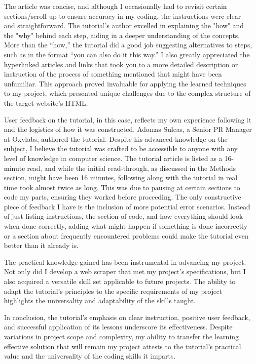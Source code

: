 \documentclass[10pt,twocolumn]{article}
\begin{document}
The article was concise, and although I occasionally had to revisit certain sections/scroll up to ensure accuracy in my coding, the instructions were clear and straightforward. The tutorial's author excelled in explaining the "how" and the "why" behind each step, aiding in a deeper understanding of the concepts. More than the “how,” the tutorial did a good job suggesting alternatives to steps, such as in the format “you can also do it this way.”  I also greatly appreciated the hyperlinked articles and links that took you to a more detailed description or instruction of the process of something mentioned that might have been unfamiliar. This approach proved invaluable for applying the learned techniques to my project, which presented unique challenges due to the complex structure of the target website's HTML.

User feedback on the tutorial, in this case, reflects my own experience following it and the logistics of how it was constructed. Adomas Sulcas, a Senior PR Manager at Oxylabs, authored the tutorial. Despite his advanced knowledge on the subject, I believe the tutorial was crafted to be accessible to anyone with any level of knowledge in computer science. The tutorial article is listed as a 16-minute read, and while the initial read-through, as discussed in the Methods section, might have been 16 minutes, following along with the tutorial in real time took almost twice as long. This was due to pausing at certain sections to code my parts, ensuring they worked before proceeding. The only constructive piece of feedback I have is the inclusion of more potential error scenarios. Instead of just listing instructions, the section of code, and how everything should look when done correctly, adding what might happen if something is done incorrectly or a section about frequently encountered problems could make the tutorial even better than it already is.

The practical knowledge gained has been instrumental in advancing my project. Not only did I develop a web scraper that met my project's specifications, but I also acquired a versatile skill set applicable to future projects. The ability to adapt the tutorial's principles to the specific requirements of my project highlights the universality and adaptability of the skills taught.

In conclusion, the tutorial's emphasis on clear instruction, positive user feedback, and successful application of its lessons underscore its effectiveness. Despite variations in project scope and complexity, my ability to transfer the learning effective solution that will remain my project attests to the tutorial's practical value and the universality of the coding skills it imparts. 
\end{document}
